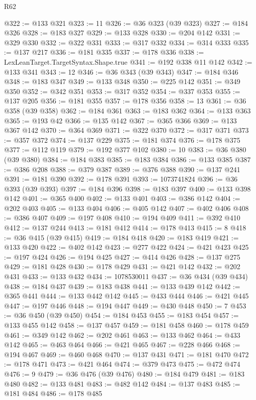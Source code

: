 \begin{lexlean}{R62}
\begin{coremodule}
@322 := @133 @321
@323 := 11
@326 := @36 @323 (@39 @323)
@327 := @184 @326
@328 := @183 @327
@329 := @133 @328
@330 := @204 @142
@331 := @329 @330
@332 := @322 @331
@333 := @317 @332
@334 := @314 @333
@335 := @137 @217
@336 := @181 @335
@337 := @178 @336
@338 := LexLeanTarget.TargetSyntax.Shape.true
@341 := @192 @338 @11 @142
@342 := @133 @341
@343 := 12
@346 := @36 @343 (@39 @343)
@347 := @184 @346
@348 := @183 @347
@349 := @133 @348
@350 := @225 @142
@351 := @349 @350
@352 := @342 @351
@353 := @317 @352
@354 := @337 @353
@355 := @137 @205
@356 := @181 @355
@357 := @178 @356
@358 := 13
@361 := @36 @358 (@39 @358)
@362 := @184 @361
@363 := @183 @362
@364 := @133 @363
@365 := @193 @42
@366 := @135 @142
@367 := @365 @366
@369 := @133 @367 @142
@370 := @364 @369
@371 := @322 @370
@372 := @317 @371
@373 := @357 @372
@374 := @137 @229
@375 := @181 @374
@376 := @178 @375
@377 := @112 @119
@379 := @192 @377 @102
@380 := 10
@383 := @36 @380 (@39 @380)
@384 := @184 @383
@385 := @183 @384
@386 := @133 @385
@387 := @386 @208
@388 := @379 @387
@389 := @376 @388
@390 := @137 @241
@391 := @181 @390
@392 := @178 @391
@393 := 1073741824
@396 := @36 @393 (@39 @393)
@397 := @184 @396
@398 := @183 @397
@400 := @133 @398 @142
@401 := @365 @400
@402 := @133 @401
@403 := @386 @142
@404 := @202 @403
@405 := @133 @404
@406 := @405 @142
@407 := @402 @406
@408 := @386 @407
@409 := @197 @408
@410 := @194 @409
@411 := @392 @410
@412 := @137 @244
@413 := @181 @412
@414 := @178 @413
@415 := 8
@418 := @36 @415 (@39 @415)
@419 := @184 @418
@420 := @183 @419
@421 := @133 @420
@422 := @402 @142
@423 := @277 @422
@424 := @421 @423
@425 := @197 @424
@426 := @194 @425
@427 := @414 @426
@428 := @137 @275
@429 := @181 @428
@430 := @178 @429
@431 := @421 @142
@432 := @202 @431
@433 := @133 @432
@434 := 1078530011
@437 := @36 @434 (@39 @434)
@438 := @184 @437
@439 := @183 @438
@441 := @133 @439 @142
@442 := @365 @441
@444 := @133 @442 @142
@445 := @433 @444
@446 := @421 @445
@447 := @197 @446
@448 := @194 @447
@449 := @430 @448
@450 := 7
@453 := @36 @450 (@39 @450)
@454 := @184 @453
@455 := @183 @454
@457 := @133 @455 @142
@458 := @137 @457
@459 := @181 @458
@460 := @178 @459
@461 := @349 @142
@462 := @202 @461
@463 := @133 @462
@464 := @433 @142
@465 := @463 @464
@466 := @421 @465
@467 := @228 @466
@468 := @194 @467
@469 := @460 @468
@470 := @137 @431
@471 := @181 @470
@472 := @178 @471
@473 := @421 @464
@474 := @379 @473
@475 := @472 @474
@476 := 9
@479 := @36 @476 (@39 @476)
@480 := @184 @479
@481 := @183 @480
@482 := @133 @481
@483 := @482 @142
@484 := @137 @483
@485 := @181 @484
@486 := @178 @485

\end{coremodule}
\end{lexlean}
